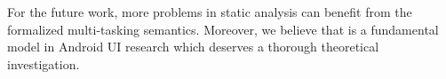 \documentclass[acmsmall,manuscript,screen,review]{acmart}
\begin{document}

For the future work, more problems in static analysis %
can %
benefit from the formalized multi-tasking semantics. 
Moreover, we believe that {\AMASS} is a fundamental model in Android UI research which deserves a thorough theoretical investigation.



\newpage
\appendix

\end{document}
